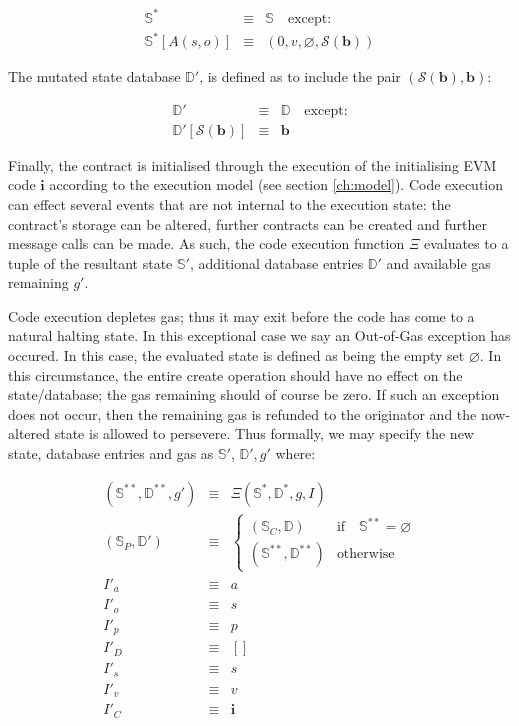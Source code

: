 \documentclass[9pt,oneside]{amsart}
\begin{document}
\begin{multicols}{2}
\begin{eqnarray}
\mathbb{S}^* & \equiv & \mathbb{S} \quad \text{except:} \\
\mathbb{S}^*[A(s, o)] & \equiv & ( 0, v, \varnothing, \mathcal{S}(\mathbf{b}) )
\end{eqnarray}

The mutated state database $\mathbb{D}'$, is defined as to include the pair $(\mathcal{S}(\mathbf{b}), \mathbf{b})$:

\begin{eqnarray}
\mathbb{D}' & \equiv & \mathbb{D} \quad \text{except:} \\
\mathbb{D}'[\mathcal{S}(\mathbf{b})] & \equiv & \mathbf{b}
\end{eqnarray}

Finally, the contract is initialised through the execution of the initialising EVM code $\mathbf{i}$ according to the execution model (see section \ref{ch:model}). Code execution can effect several events that are not internal to the execution state: the contract's storage can be altered, further contracts can be created and further message calls can be made. As such, the code execution function $\Xi$ evaluates to a tuple of the resultant state $\mathbb{S}'$, additional database entries $\mathbb{D}'$ and available gas remaining $g'$.

Code execution depletes gas; thus it may exit before the code has come to a natural halting state. In this exceptional case we say an Out-of-Gas exception has occured. In this case, the evaluated state is defined as being the empty set $\varnothing$. In this circumstance, the entire create operation should have no effect on the state/database; the gas remaining should of course be zero. If such an exception does not occur, then the remaining gas is refunded to the originator and the now-altered state is allowed to persevere. Thus formally, we may specify the new state, database entries and gas as $\mathbb{S}'$, $\mathbb{D}', g'$ where:

\begin{eqnarray}
(\mathbb{S}^{**}, \mathbb{D}^{**}, g') & \equiv & \Xi(\mathbb{S}^*, \mathbb{D}^*, g, I) \\
(\mathbb{S}_P, \mathbb{D}') & \equiv & \begin{cases}
(\mathbb{S}_C, \mathbb{D}) & \text{if} \quad \mathbb{S}^{**} = \varnothing \\
(\mathbb{S}^{**}, \mathbb{D}^{**}) & \text{otherwise}
\end{cases} \\
I'_a & \equiv & a \\
I'_o & \equiv & s \\
I'_p & \equiv & p \\
I'_D & \equiv & [] \\
I'_s & \equiv & s \\
I'_v & \equiv & v \\
I'_C & \equiv & \mathbf{i}
\end{eqnarray}


\end{multicols}
\end{document}
